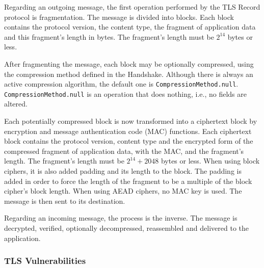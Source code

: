 \documentclass{sig-alternate-05-2015}
\begin{document}
Regarding an outgoing message, the first operation performed by the TLS Record protocol is fragmentation. The message is divided into blocks. %
Each block contains the protocol version, the content type, the fragment of application data and this fragment's length in bytes. The fragment's length must be $2^{14}$ bytes or less.

After fragmenting the message, each block may be optionally compressed, using the compression method defined in the Handshake.
Although there is always an active compression algorithm, the default one is \texttt{CompressionMethod.null}. \texttt{CompressionMethod.null} is an operation that does nothing, i.e., no fields are altered.

Each potentially compressed block is now transformed into a ciphertext block by encryption and message authentication code (MAC) functions. Each ciphertext block contains the protocol version, content type and the encrypted form of the compressed fragment of application data, with the MAC, and the fragment's length.  The fragment's length must be $2^{14} + 2048$ bytes or less. When using block ciphers, it is also added  padding and its length to the block. The padding is added in order to force the length of the fragment to be a multiple of the block cipher's block length. When using AEAD ciphers, no MAC key is used.
The message is then sent to its destination.

Regarding an incoming message, the process is the inverse. The message is decrypted, verified, optionally decompressed, reassembled and delivered to the application.



\subsubsection{TLS Vulnerabilities}
\label{tls-vulnerabilities}
\end{document}

